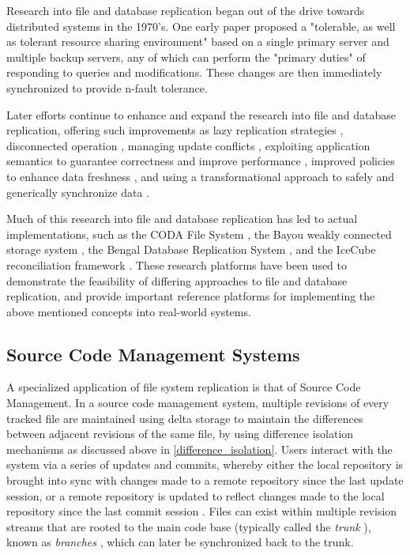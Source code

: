 Research into file and database replication began out of the drive towards distributed systems in the 1970's.  One early paper \cite{807732} proposed a "tolerable, as well as tolerant resource sharing environment" based on a single primary server and multiple backup servers, any of which can perform the "primary duties" of responding to queries and modifications.  These changes are then immediately synchronized to provide n-fault tolerance.

Later efforts \cite{138877, RefWorks:16, RefWorks:27, 50215, 335391, bengal, 384020, RefWorks:18} continue to enhance and expand the research into file and database replication, offering such improvements as lazy replication strategies \cite{138877}, disconnected operation \cite{RefWorks:16}, managing update conflicts \cite{RefWorks:27}, exploiting application semantics to guarantee correctness and improve performance \cite{50215}, improved policies to enhance data freshness \cite{335391}, and using a transformational approach to safely and generically synchronize data \cite{RefWorks:18}.

Much of this research into file and database replication has led to actual implementations, such as the CODA File System \cite{RefWorks:16}, the Bayou weakly connected storage system \cite{RefWorks:27}, the Bengal Database Replication System \cite{bengal}, and the IceCube reconciliation framework \cite{384020}.  These research platforms have been used to demonstrate the feasibility of differing approaches to file and database replication, and provide important reference platforms for implementing the above mentioned concepts into real-world systems.

\subsection{Source Code Management Systems}\label{scms}

A specialized application of file system replication is that of Source Code Management.  In a source code management system, multiple revisions of every tracked file are maintained using delta storage \cite{rochkind:scc} to maintain the differences between adjacent revisions of the same file, by using difference isolation mechanisms as discussed above in \ref{difference_isolation}.  Users interact with the system via a series of updates and commits, whereby either the local repository is brought into sync with changes made to a remote repository since the last update session, or a remote repository is updated to reflect changes made to the local repository since the last commit session \cite{wiki:CVS, RefWorks:8}.  Files can exist within multiple revision streams that are rooted to the main code base (typically called the \emph{trunk} \cite{wiki:CVS, RefWorks:8}), known as \emph{branches} \cite{811111}, which can later be synchronized  back to the trunk.

